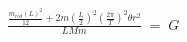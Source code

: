 \documentclass[preview]{standalone}
\begin{document}
\begin{align*}
\frac{\frac{m_{rod}(L)^2}{12}+2m(\frac{L}{2})^2(\frac{2\pi}{T})^2\theta r^2}{LMm} \;=\; G
\end{align*}
\end{document}
